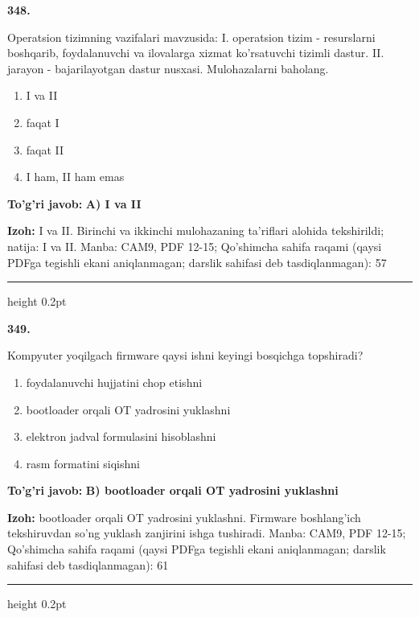 \documentclass[10pt,a4paper]{article}
\begin{document}
{\bfseries\sffamily\color{ink} 348.}
\par
Operatsion tizimning vazifalari mavzusida: I. operatsion tizim - resurslarni boshqarib, foydalanuvchi va ilovalarga xizmat ko'rsatuvchi tizimli dastur. II. jarayon - bajarilayotgan dastur nusxasi. Mulohazalarni baholang.
\begin{enumerate}[label=\Alph*),leftmargin=9mm]
\item I va II
\item faqat I
\item faqat II
\item I ham, II ham emas
\end{enumerate}
\begin{tcolorbox}[enhanced,breakable,colback=teal!4,colframe=teal!60!black,boxrule=0.45pt,arc=1.2mm,left=2.7mm,right=2.7mm,top=1.8mm,bottom=1.8mm,before skip=2mm,after skip=2mm]
{\bfseries\sffamily\color{teal}To'g'ri javob:} \textbf{A) I va II}
\par\smallskip
{\bfseries Izoh:} I va II. Birinchi va ikkinchi mulohazaning ta'riflari alohida tekshirildi; natija: I va II. Manba: CAM9, PDF 12-15; Qo'shimcha sahifa raqami (qaysi PDFga tegishli ekani aniqlanmagan; darslik sahifasi deb tasdiqlanmagan): 57
\end{tcolorbox}
\vspace{2mm}\hrule height 0.2pt\vspace{3mm}

{\bfseries\sffamily\color{ink} 349.}
\par
Kompyuter yoqilgach firmware qaysi ishni keyingi bosqichga topshiradi?
\begin{enumerate}[label=\Alph*),leftmargin=9mm]
\item foydalanuvchi hujjatini chop etishni
\item bootloader orqali OT yadrosini yuklashni
\item elektron jadval formulasini hisoblashni
\item rasm formatini siqishni
\end{enumerate}
\begin{tcolorbox}[enhanced,breakable,colback=teal!4,colframe=teal!60!black,boxrule=0.45pt,arc=1.2mm,left=2.7mm,right=2.7mm,top=1.8mm,bottom=1.8mm,before skip=2mm,after skip=2mm]
{\bfseries\sffamily\color{teal}To'g'ri javob:} \textbf{B) bootloader orqali OT yadrosini yuklashni}
\par\smallskip
{\bfseries Izoh:} bootloader orqali OT yadrosini yuklashni. Firmware boshlang'ich tekshiruvdan so'ng yuklash zanjirini ishga tushiradi. Manba: CAM9, PDF 12-15; Qo'shimcha sahifa raqami (qaysi PDFga tegishli ekani aniqlanmagan; darslik sahifasi deb tasdiqlanmagan): 61
\end{tcolorbox}
\vspace{2mm}\hrule height 0.2pt\vspace{3mm}
\end{document}

